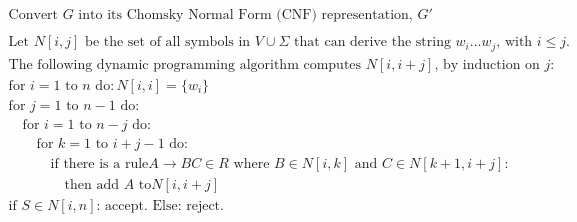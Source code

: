 \documentclass[12pt]{article}
\begin{document}
\begin{enumerate}
\begin{itemize}
\[
\begin{array}{l}
\textrm{Convert $G$ into its Chomsky Normal Form (CNF) representation, $G'$} \\ \\
\textrm{Let $N[i,j]$ be the set of all symbols in $V\cup\Sigma$ that can derive the string
  $w_i \ldots w_j$, with $i \leq j$.} \\[2ex]
\textrm{The following dynamic programming algorithm computes $N[i,i+j]$, by induction on $j$:}\\[2ex]
\textrm{for $i = 1$ to $n$ do}: N[i,i] = \{w_i\} \\
\textrm{for $j = 1$ to $n-1$ do}: \\
\quad \textrm{for $i = 1$ to $n-j$ do}: \\
\quad\quad \textrm{for $k = 1$ to $i+j-1$ do}: \\
\quad\quad\quad \textrm{if there is a rule} A \rightarrow BC \in R \textrm{ where } B \in N[i,k]
\textrm{ and } C \in N[k+1,i+j]: \\
\quad\quad\quad\quad \textrm{then add $A$ to} N[i, i+j]\\
\textrm{if } S \in N[i,n] \textrm{: accept. Else: reject.} 
\end{array}
\]

\end{itemize}


\end{enumerate}
\end{document}
